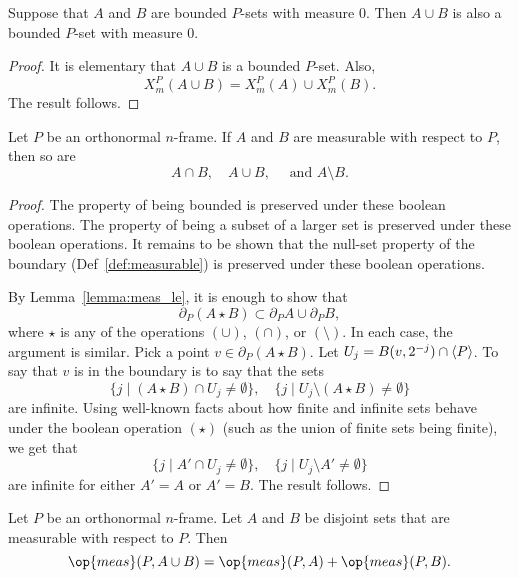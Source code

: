\begin{lemma}  Suppose that $A$ and $B$ are bounded $P$-sets with
measure $0$.  Then $A\cup B$ is also a bounded $P$-set with measure
$0$.
\end{lemma}

\begin{proof}  It is elementary that $A\cup B$ is a bounded $P$-set.
Also, $$X^P_m(A\cup B) = X^P_m(A)\cup X^P_m(B).$$  The result
follows.
\end{proof}

\begin{lemma}
    Let $P$ be an orthonormal $n$-frame.
    If $A$ and $B$ are measurable with respect to $P$, then so are
    $$A\cap B,\quad A\cup B,\quad\text{ and }A\setminus B.$$
\end{lemma}

\begin{proof}  The property of being  bounded is preserved under
these boolean operations.  The property of being a subset of a
larger set is preserved under these boolean operations.  It remains
to be shown that the null-set property of the boundary
(Def~\ref{def:measurable}) is preserved under these boolean
operations.

By Lemma~\ref{lemma:meas_le}, it is enough to show that
    $$\partial_P (A \star B) \subset \partial_P A \cup \partial_P
    B,$$
where $\star$ is any of the operations $(\cup)$, $(\cap)$, or
$(\setminus)$.  In each case, the argument is similar.  Pick a point
$v\in\partial_P(A\star B)$. Let $U_j = B(v,2^{-j})\cap{\langle P\rangle}$. To
say that $v$ is in the boundary is to say that the sets
    $$
    \{j \mid (A\star B)\cap U_j\ne\emptyset\},\quad
    \{j \mid U_j\setminus (A\star B)\ne\emptyset\}
    $$
are infinite. Using well-known facts about how finite and infinite
sets behave under the boolean operation $(\star)$ (such as the union
of finite sets being finite), we get that
    $$
    \{j \mid A'\cap U_j\ne\emptyset\},\quad
    \{j \mid U_j\setminus A'\ne\emptyset\}
    $$
are infinite for either $A'=A$ or $A'=B$.  The result follows.
\end{proof}

\begin{lemma}\label{lemma:alg}  Let $P$ be an orthonormal $n$-frame.  Let $A$ and $B$
be disjoint sets that are measurable with respect to $P$.  Then
    $$\op{meas}(P,A\cup B) = \op{meas}(P,A) + \op{meas}(P,B).$$
\end{lemma}

